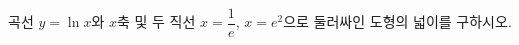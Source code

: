 \hspace*{2mm}\begin{minipage}[t]{\dimexpr\linewidth-2mm\relax}\vspace{0pt}
곡선 $y=\ln x$와 $x$축 및 두 직선 $x=\dfrac{1}{e}$, $x=e^2$으로 둘러싸인 도형의 넓이를 구하시오.\end{minipage}
